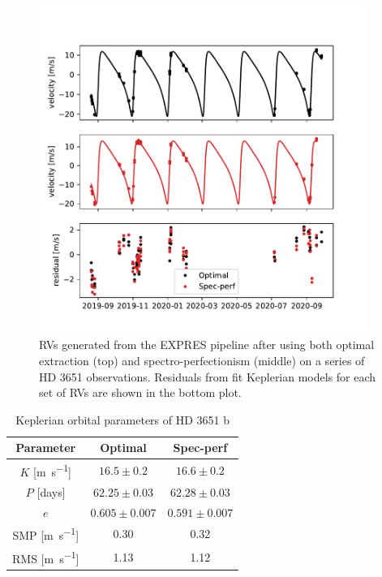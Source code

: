 \begin{figure}
    \centering
    \includegraphics[width=0.95\textwidth]{figures-5/spec-perf-rvs.pdf}
    \caption[Spectro-perfectionism vs. optimal extraction -- HD 3651 radial velocities]{RVs generated from the EXPRES pipeline after using both optimal extraction (top) and spectro-perfectionism (middle) on a series of HD 3651 observations. Residuals from fit Keplerian models for each set of RVs are shown in the bottom plot.}
    \label{fig:spec-perf-rvs}
\end{figure}

\begin{table}
    \centering
    \caption[HD 3651 -- Keplerian orbital parameter comparison (extraction method)]{Keplerian orbital parameters of HD 3651 b}
    \begin{tabular}{c|cc}
        \hline
        \hline
        Parameter & Optimal & Spec-perf \\
        \hline
        $K$ [\si{\meter\per\second}] & $16.5 \pm 0.2$ & $16.6 \pm 0.2$ \\
        $P$ [days] & $62.25 \pm 0.03$ & $62.28 \pm 0.03$ \\
        $e$ & $0.605 \pm 0.007$ & $0.591 \pm 0.007$ \\
        SMP [\si{\meter\per\second}] & 0.30 & 0.32 \\
        RMS [\si{\meter\per\second}] & 1.13 & 1.12 \\
    \end{tabular}
    \label{tab:spec-perf-rvs}
\end{table}

